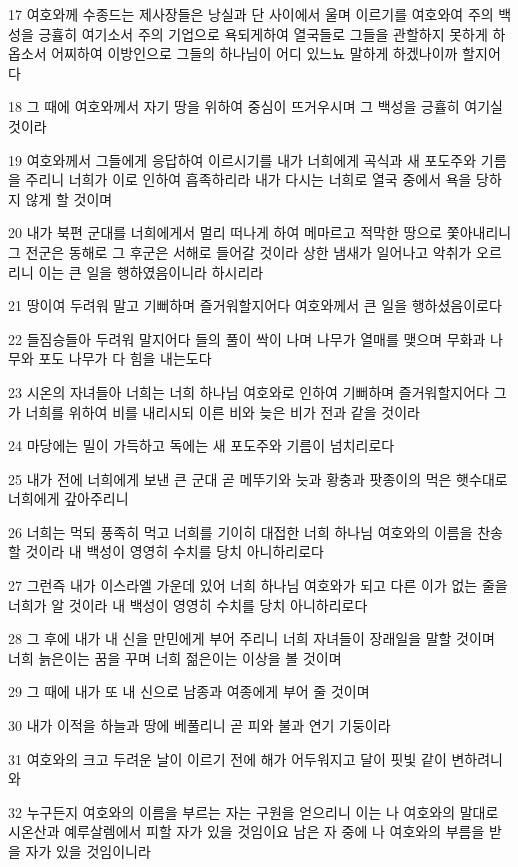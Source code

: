 \par 17 여호와께 수종드는 제사장들은 낭실과 단 사이에서 울며 이르기를 여호와여 주의 백성을 긍휼히 여기소서 주의 기업으로 욕되게하여 열국들로 그들을 관할하지 못하게 하옵소서 어찌하여 이방인으로 그들의 하나님이 어디 있느뇨 말하게 하겠나이까 할지어다
\par 18 그 때에 여호와께서 자기 땅을 위하여 중심이 뜨거우시며 그 백성을 긍휼히 여기실 것이라
\par 19 여호와께서 그들에게 응답하여 이르시기를 내가 너희에게 곡식과 새 포도주와 기름을 주리니 너희가 이로 인하여 흡족하리라 내가 다시는 너희로 열국 중에서 욕을 당하지 않게 할 것이며
\par 20 내가 북편 군대를 너희에게서 멀리 떠나게 하여 메마르고 적막한 땅으로 쫓아내리니 그 전군은 동해로 그 후군은 서해로 들어갈 것이라 상한 냄새가 일어나고 악취가 오르리니 이는 큰 일을 행하였음이니라 하시리라
\par 21 땅이여 두려워 말고 기뻐하며 즐거워할지어다 여호와께서 큰 일을 행하셨음이로다
\par 22 들짐승들아 두려워 말지어다 들의 풀이 싹이 나며 나무가 열매를 맺으며 무화과 나무와 포도 나무가 다 힘을 내는도다
\par 23 시온의 자녀들아 너희는 너희 하나님 여호와로 인하여 기뻐하며 즐거워할지어다 그가 너희를 위하여 비를 내리시되 이른 비와 늦은 비가 전과 같을 것이라
\par 24 마당에는 밀이 가득하고 독에는 새 포도주와 기름이 넘치리로다
\par 25 내가 전에 너희에게 보낸 큰 군대 곧 메뚜기와 늣과 황충과 팟종이의 먹은 햇수대로 너희에게 갚아주리니
\par 26 너희는 먹되 풍족히 먹고 너희를 기이히 대접한 너희 하나님 여호와의 이름을 찬송할 것이라 내 백성이 영영히 수치를 당치 아니하리로다
\par 27 그런즉 내가 이스라엘 가운데 있어 너희 하나님 여호와가 되고 다른 이가 없는 줄을 너희가 알 것이라 내 백성이 영영히 수치를 당치 아니하리로다
\par 28 그 후에 내가 내 신을 만민에게 부어 주리니 너희 자녀들이 장래일을 말할 것이며 너희 늙은이는 꿈을 꾸며 너희 젊은이는 이상을 볼 것이며
\par 29 그 때에 내가 또 내 신으로 남종과 여종에게 부어 줄 것이며
\par 30 내가 이적을 하늘과 땅에 베풀리니 곧 피와 불과 연기 기둥이라
\par 31 여호와의 크고 두려운 날이 이르기 전에 해가 어두워지고 달이 핏빛 같이 변하려니와
\par 32 누구든지 여호와의 이름을 부르는 자는 구원을 얻으리니 이는 나 여호와의 말대로 시온산과 예루살렘에서 피할 자가 있을 것임이요 남은 자 중에 나 여호와의 부름을 받을 자가 있을 것임이니라

